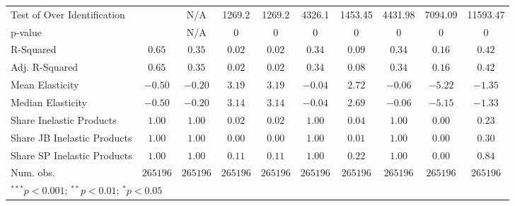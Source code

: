 \begin{tabular}{l c c c c c c c c c}
Test of Over Identification &               & N/A           & 1269.2        & 1269.2        & 4326.1        & 1453.45       & 4431.98       & 7094.09       & 11593.47      \\
p-value                     &               & N/A           & 0             & 0             & 0             & 0             & 0             & 0             & 0             \\
R-Squared                   & $0.65$        & $0.35$        & $0.02$        & $0.02$        & $0.34$        & $0.09$        & $0.34$        & $0.16$        & $0.42$        \\
Adj. R-Squared              & $0.65$        & $0.35$        & $0.02$        & $0.02$        & $0.34$        & $0.08$        & $0.34$        & $0.16$        & $0.42$        \\
Mean Elasticity             & $-0.50$       & $-0.20$       & $3.19$        & $3.19$        & $-0.04$       & $2.72$        & $-0.06$       & $-5.22$       & $-1.35$       \\
Median Elasticity           & $-0.50$       & $-0.20$       & $3.14$        & $3.14$        & $-0.04$       & $2.69$        & $-0.06$       & $-5.15$       & $-1.33$       \\
Share Inelastic Products    & $1.00$        & $1.00$        & $0.02$        & $0.02$        & $1.00$        & $0.04$        & $1.00$        & $0.00$        & $0.23$        \\
Share JB Inelastic Products & $1.00$        & $1.00$        & $0.00$        & $0.00$        & $1.00$        & $0.01$        & $1.00$        & $0.00$        & $0.30$        \\
Share SP Inelastic Products & $1.00$        & $1.00$        & $0.11$        & $0.11$        & $1.00$        & $0.22$        & $1.00$        & $0.00$        & $0.84$        \\
Num. obs.                   & $265196$      & $265196$      & $265196$      & $265196$      & $265196$      & $265196$      & $265196$      & $265196$      & $265196$      \\
\bottomrule
\multicolumn{10}{l}{\scriptsize{$^{***}p<0.001$; $^{**}p<0.01$; $^{*}p<0.05$}}
\end{tabular}
